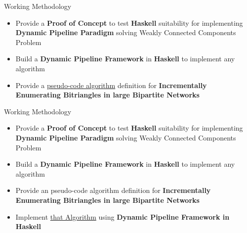 \begin{frame}[fragile]{Working Methodology}
    \begin{itemize}
      \setlength\itemsep{1.5em}
      \item {\color{light}Provide a \textbf{Proof of Concept} to test \textbf{Haskell} suitability for implementing  \textbf{Dynamic Pipeline Paradigm} solving Weakly Connected Components Problem}
      \item {\color{light}Build a \textbf{Dynamic Pipeline Framework} in \textbf{Haskell} to implement any algorithm }
      \item Provide a \underline{\color{red}pseudo-code algorithm} definition for \textbf{Incrementally Enumerating Bitriangles in large Bipartite Networks}
  \end{itemize}   
\end{frame}

\begin{frame}[fragile]{Working Methodology}
    \begin{itemize}
      \setlength\itemsep{1.5em}
      \item {\color{light}Provide a \textbf{Proof of Concept} to test \textbf{Haskell} suitability for implementing  \textbf{Dynamic Pipeline Paradigm} solving Weakly Connected Components Problem}
      \item {\color{light}Build a \textbf{Dynamic Pipeline Framework} in \textbf{Haskell} to implement any algorithm }
      \item {\color{light}Provide an pseudo-code algorithm definition for \textbf{Incrementally Enumerating Bitriangles in large Bipartite Networks}}
      \item Implement \underline{\color{red}that Algorithm} using \textbf{Dynamic Pipeline Framework in Haskell}
  \end{itemize}   
\end{frame}


